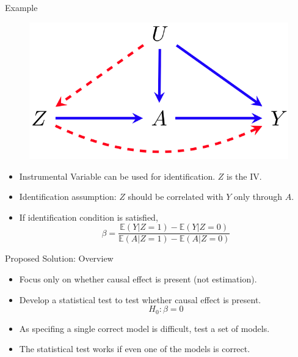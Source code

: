 \documentclass{beamer}
\begin{document}
\begin{frame}{Example}
	\begin{figure}
		\center
		\includegraphics[scale=0.2]{m3.png}
	\end{figure}
	\vspace{1em}
	\begin{itemize}
		\item Instrumental Variable can be used for identification. $ Z $ is the IV.
		\item Identification assumption: $ Z $ should be correlated with $ Y $ only through $ A $.
		\item If identification condition is satisfied,
			$$ \beta = \frac{\mathbb{E}(Y | Z = 1) - \mathbb{E}(Y | Z = 0)}{\mathbb{E}(A | Z = 1) - \mathbb{E}(A | Z=0)} $$
	\end{itemize}
\end{frame}

\begin{frame}{Proposed Solution: Overview}
	\begin{itemize}
		\item Focus only on whether causal effect is present (not estimation).
		\item Develop a statistical test to test whether causal effect is present. 
			$$ H_0: \beta = 0 $$
		\item As specifing a single correct model is difficult, test a set of models.
		\item The statistical test works if even one of the models is correct.
	\end{itemize}
\end{frame}
\end{document}
